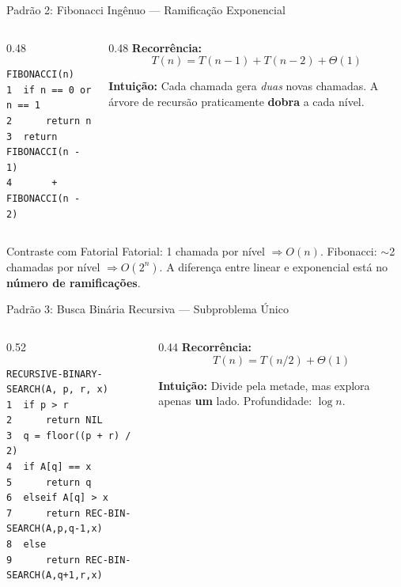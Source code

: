 \documentclass[aspectratio=169]{beamer}
\begin{document}
\begin{frame}{Padrão 2: Fibonacci Ingênuo --- Ramificação Exponencial}
    \begin{columns}[T]
    \begin{column}{0.48\textwidth}
\begin{verbatim}
FIBONACCI(n)
1  if n == 0 or n == 1
2      return n
3  return FIBONACCI(n - 1) 
4       + FIBONACCI(n - 2)
\end{verbatim}
    \end{column}
    \begin{column}{0.48\textwidth}
        \textbf{Recorrência:}
        \[
            T(n) = T(n{-}1) + T(n{-}2) + \Theta(1)
        \]
        
        \textbf{Intuição:} Cada chamada gera \emph{duas} novas chamadas. A árvore de recursão praticamente \textbf{dobra} a cada nível.
    \end{column}
    \end{columns}
    
    \vspace{0.2cm}
    \begin{alertblock}{Contraste com Fatorial}
        Fatorial: 1 chamada por nível $\Rightarrow O(n)$. Fibonacci: $\sim$2 chamadas por nível $\Rightarrow O(2^n)$.
        A diferença entre linear e exponencial está no \textbf{número de ramificações}.
    \end{alertblock}
    \hfill{}
\end{frame}


\begin{frame}{Padrão 3: Busca Binária Recursiva --- Subproblema Único}
    \begin{columns}[T]
    \begin{column}{0.52\textwidth}
\small
\begin{verbatim}
RECURSIVE-BINARY-SEARCH(A, p, r, x)
1  if p > r
2      return NIL
3  q = floor((p + r) / 2)
4  if A[q] == x
5      return q
6  elseif A[q] > x
7      return REC-BIN-SEARCH(A,p,q-1,x)
8  else
9      return REC-BIN-SEARCH(A,q+1,r,x)
\end{verbatim}
    \end{column}
    \begin{column}{0.44\textwidth}
        \textbf{Recorrência:}
        \[
            T(n) = T(n/2) + \Theta(1)
        \]
        
        \textbf{Intuição:} Divide pela metade, mas explora apenas \textbf{um} lado. Profundidade: $\log n$.
    \end{column}
    \end{columns}
    
    \vspace{0.2cm}
    \hfill{}
\end{frame}
\end{document}
